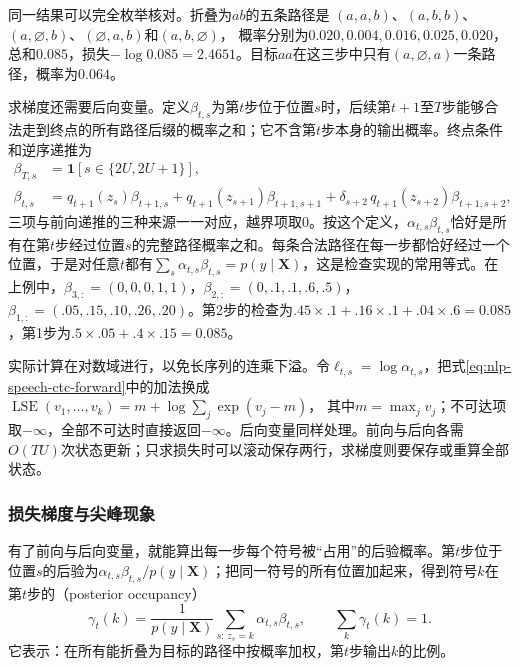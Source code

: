 同一结果可以完全枚举核对。折叠为$ab$的五条路径是
$(a,a,b)$、$(a,b,b)$、$(a,\varnothing,b)$、$(\varnothing,a,b)$和$(a,b,\varnothing)$，
概率分别为$0.020,0.004,0.016,0.025,0.020$，总和$0.085$，损失$-\log0.085=2.4651$。目标$aa$在这三步中只有$(a,\varnothing,a)$一条路径，概率为$0.064$。

求梯度还需要后向变量。定义$\beta_{t,s}$为第$t$步位于位置$s$时，后续第$t+1$至$T$步能够合法走到终点的所有路径后缀的概率之和；它不含第$t$步本身的输出概率。终点条件和逆序递推为
\begin{equation}
\begin{aligned}
 \beta_{T,s}&=\mathbf{1}[s\in\{2U,2U+1\}],\\
 \beta_{t,s}&=q_{t+1}(z_s)\beta_{t+1,s}+q_{t+1}(z_{s+1})\beta_{t+1,s+1}
   +\delta_{s+2}\,q_{t+1}(z_{s+2})\beta_{t+1,s+2},
\end{aligned}
\label{eq:nlp-speech-ctc-backward}
\end{equation}
三项与前向递推的三种来源一一对应，越界项取0。按这个定义，$\alpha_{t,s}\beta_{t,s}$恰好是所有在第$t$步经过位置$s$的完整路径概率之和。每条合法路径在每一步都恰好经过一个位置，于是对任意$t$都有$\sum_s\alpha_{t,s}\beta_{t,s}=p(y\mid\bm{X})$，这是检查实现的常用等式。在上例中，$\beta_{3,:}=(0,0,0,1,1)$，$\beta_{2,:}=(0,.1,.1,.6,.5)$，$\beta_{1,:}=(.05,.15,.10,.26,.20)$。第2步的检查为$.45\times.1+.16\times.1+.04\times.6=0.085$，第1步为$.5\times.05+.4\times.15=0.085$。

实际计算在对数域进行，以免长序列的连乘下溢。令$\ell_{t,s}=\log\alpha_{t,s}$，把式\eqref{eq:nlp-speech-ctc-forward}中的加法换成
$\operatorname{LSE}(v_1,\ldots,v_k)=m+\log\sum_j\exp(v_j-m)$，
其中$m=\max_jv_j$；不可达项取$-\infty$，全部不可达时直接返回$-\infty$。后向变量同样处理。前向与后向各需$O(TU)$次状态更新；只求损失时可以滚动保存两行，求梯度则要保存或重算全部状态。

\subsubsection{损失梯度与尖峰现象}
\label{sec:nlp-speech-ctc-gradient}

有了前向与后向变量，就能算出每一步每个符号被“占用”的后验概率。第$t$步位于位置$s$的后验为$\alpha_{t,s}\beta_{t,s}/p(y\mid\bm{X})$；把同一符号的所有位置加起来，得到符号$k$在第$t$步的（posterior occupancy）
\begin{equation}
 \gamma_t(k)=\frac{1}{p(y\mid\bm{X})}\sum_{s:\,z_s=k}\alpha_{t,s}\beta_{t,s},
 \qquad \sum_{k}\gamma_t(k)=1.
 \label{eq:nlp-speech-ctc-occupancy}
\end{equation}
它表示：在所有能折叠为目标的路径中按概率加权，第$t$步输出$k$的比例。

